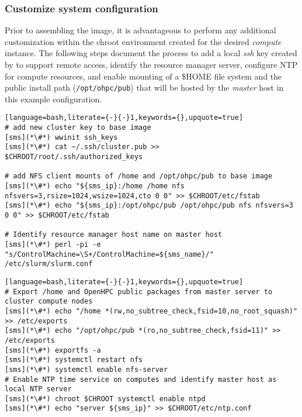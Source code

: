\documentclass[letterpaper]{article}
\begin{document}
\subsubsection{Customize system configuration} \label{sec:master_customization}

Prior to assembling the image, it is advantageous to perform any additional
customization within the chroot environment created for the desired {\em
 compute} instance. The following steps document the process to add a local
{\em ssh} key created by \Warewulf{} to support remote access, identify the
resource manager server, configure NTP for compute resources, and enable \NFS{}
mounting of a \$HOME file system and the public \OHPC{} install path
(\texttt{/opt/ohpc/pub}) that will be hosted by the {\em master} host in this
example configuration.

\begin{lstlisting}[language=bash,literate={-}{-}1,keywords={},upquote=true]
# add new cluster key to base image
[sms](*\#*) wwinit ssh_keys
[sms](*\#*) cat ~/.ssh/cluster.pub >> $CHROOT/root/.ssh/authorized_keys

# add NFS client mounts of /home and /opt/ohpc/pub to base image
[sms](*\#*) echo "${sms_ip}:/home /home nfs nfsvers=3,rsize=1024,wsize=1024,cto 0 0" >> $CHROOT/etc/fstab
[sms](*\#*) echo "${sms_ip}:/opt/ohpc/pub /opt/ohpc/pub nfs nfsvers=3 0 0" >> $CHROOT/etc/fstab

# Identify resource manager host name on master host
[sms](*\#*) perl -pi -e "s/ControlMachine=\S+/ControlMachine=${sms_name}/" /etc/slurm/slurm.conf
\end{lstlisting}

\begin{lstlisting}[language=bash,literate={-}{-}1,keywords={},upquote=true]
# Export /home and OpenHPC public packages from master server to cluster compute nodes
[sms](*\#*) echo "/home *(rw,no_subtree_check,fsid=10,no_root_squash)" >> /etc/exports
[sms](*\#*) echo "/opt/ohpc/pub *(ro,no_subtree_check,fsid=11)" >> /etc/exports
[sms](*\#*) exportfs -a
[sms](*\#*) systemctl restart nfs
[sms](*\#*) systemctl enable nfs-server
# Enable NTP time service on computes and identify master host as local NTP server
[sms](*\#*) chroot $CHROOT systemctl enable ntpd
[sms](*\#*) echo "server ${sms_ip}" >> $CHROOT/etc/ntp.conf
\end{lstlisting}
\end{document}
